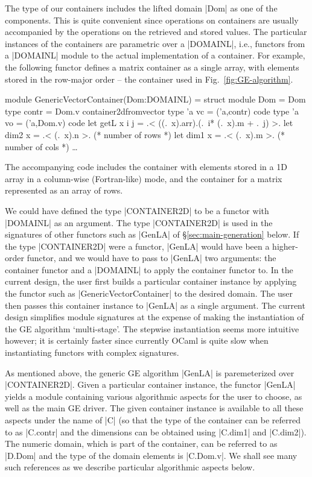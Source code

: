 \documentclass{elsart}
\begin{document}
The type of our containers includes the lifted domain |Dom| as one of
the components. This is quite convenient since operations on
containers are usually accompanied by the operations on the retrieved
and stored values. The particular instances of the containers are
parametric over a |DOMAINL|, i.e., functors from a |DOMAINL| module to
the actual implementation of a container.  For example, the following
functor defines a matrix container as a single array, with elements
stored in the row-major order -- the container used in
Fig.~\ref{fig:GE-algorithm}.
\begin{code}[commandchars=\\\{\}]
module GenericVectorContainer(Dom:DOMAINL) =
  struct
  module Dom = Dom
  type contr = Dom.v container2dfromvector
  type 'a vc = ('a,contr) code
  type 'a vo = ('a,Dom.v) code
  let getL x i j = .< ((.~x).arr).(.~i* (.~x).m + .~j) >.
  let dim2 x = .< (.~x).n >.      (* number of rows *)
  let dim1 x = .< (.~x).m >.      (* number of cols *)
  \dots
\end{code}
The accompanying code \cite{metamonadsURL} includes the container with
elements stored in a 1D array in a column-wise (Fortran-like)
mode, and the container for a matrix represented as an array of rows.

We could have defined the type |CONTAINER2D| to be a functor with
|DOMAINL| as an argument. The type |CONTAINER2D| is used in the
signatures of other functors such as |GenLA| of
\S\ref{sec:main-generation} below. If the type |CONTAINER2D| were a
functor, |GenLA| would have been a higher-order functor, and we would
have to pass to |GenLA| two arguments: the container functor and a
|DOMAINL| to apply the container functor to. In the current design,
the user first builds a particular container instance by applying the
functor such as |GenericVectorContainer| to the desired domain. The
user then passes this container instance to |GenLA| as a single
argument. The current design simplifies module signatures at
the expense of making the instantiation of the GE algorithm
`multi-stage'. The stepwise instantiation seems more intuitive
however; it is certainly faster since currently OCaml is quite slow
when instantiating functors with complex signatures.

As mentioned above, the generic GE algorithm |GenLA| is paremeterized
over |CONTAINER2D|.  Given a particular container instance, the
functor |GenLA| yields a module containing various algorithmic aspects
for the user to choose, as well as the main GE driver. The given
container instance is available to all these aspects under the name of
|C| (so that the type of the container can be referred to as |C.contr|
and the dimensions can be obtained using |C.dim1| and |C.dim2|). The
numeric domain, which is part of the container, can be referred to as
|D.Dom| and the type of the domain elements is |C.Dom.v|. We shall see
many such references as we describe particular algorithmic aspects
below.
\end{document}
